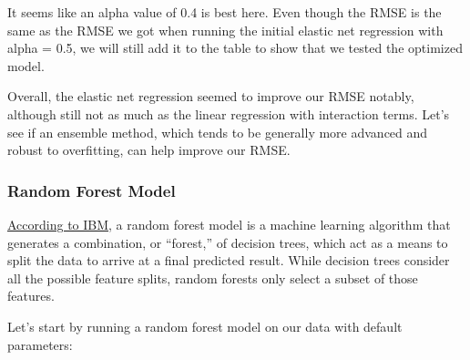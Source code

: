 \documentclass[
]{article}
\newenvironment{Shaded}{\begin{snugshade}}{\end{snugshade}}
\newcommand{\AttributeTok}[1]{\textcolor[rgb]{0.13,0.29,0.53}{#1}}
\newcommand{\DecValTok}[1]{\textcolor[rgb]{0.00,0.00,0.81}{#1}}
\newcommand{\FunctionTok}[1]{\textcolor[rgb]{0.13,0.29,0.53}{\textbf{#1}}}
\newcommand{\NormalTok}[1]{#1}
\newcommand{\OtherTok}[1]{\textcolor[rgb]{0.56,0.35,0.01}{#1}}
\newcommand{\SpecialCharTok}[1]{\textcolor[rgb]{0.81,0.36,0.00}{\textbf{#1}}}
\newcommand{\StringTok}[1]{\textcolor[rgb]{0.31,0.60,0.02}{#1}}
\begin{document}
It seems like an alpha value of 0.4 is best here. Even though the RMSE
is the same as the RMSE we got when running the initial elastic net
regression with alpha = 0.5, we will still add it to the table to show
that we tested the optimized model.

Overall, the elastic net regression seemed to improve our RMSE notably,
although still not as much as the linear regression with interaction
terms. Let's see if an ensemble method, which tends to be generally more
advanced and robust to overfitting, can help improve our RMSE.

\hypertarget{random-forest-model}{%
\subsubsection{Random Forest Model}\label{random-forest-model}}

\href{https://www.ibm.com/topics/random-forest}{According to IBM}, a
random forest model is a machine learning algorithm that generates a
combination, or ``forest,'' of decision trees, which act as a means to
split the data to arrive at a final predicted result. While decision
trees consider all the possible feature splits, random forests only
select a subset of those features.

Let's start by running a random forest model on our data with default
parameters:

\begin{Shaded}
\end{Shaded}
\end{document}
